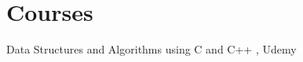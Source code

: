 
\section{Courses}
 \begin{itemize}[leftmargin=0.15in, label={}] %
    \small{
    \item{ Data Structures and Algorithms using C and C++ , Udemy}
    }
 \end{itemize}